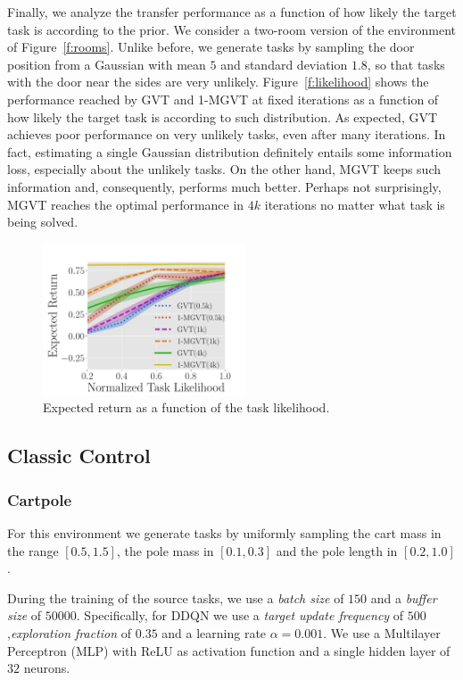 \documentclass{article}
\begin{document}
Finally, we analyze the transfer performance as a function of how likely the target task is according to the prior. We consider a two-room version of the environment of Figure~\ref{f:rooms}. Unlike before, we generate tasks by sampling the door position from a Gaussian with mean $5$ and standard deviation $1.8$, so that tasks with the door near the sides are very unlikely. Figure~\ref{f:likelihood} shows the performance reached by GVT and 1-MGVT at fixed iterations as a function of how likely the target task is according to such distribution. As expected, GVT achieves poor performance on very unlikely tasks, even after many iterations. In fact, estimating a single Gaussian distribution definitely entails some information loss, especially about the unlikely tasks. On the other hand, MGVT keeps such information and, consequently, performs much better. Perhaps not surprisingly, MGVT reaches the optimal performance in $4k$ iterations no matter what task is being solved.

\begin{figure}[t]
\centering
    \includegraphics[trim=0.0cm 0cm 1.2cm 1.3cm,clip=true,height=4.5cm]{images/likelihood/lrew.pdf}
    \caption{Expected return as a function of the task likelihood.}
  \label{fig:likelihood}
\end{figure}


\subsection{Classic Control}\label{app:c2}

\subsubsection{Cartpole}

For this environment we generate tasks by uniformly sampling the cart mass in the range $\left[0.5,1.5\right]$, the pole mass in $\left[0.1,0.3\right]$ and the pole length in $\left[0.2,1.0\right]$. 

During the training of the source tasks, we use a \textit{batch size} of $150$ and a \textit{buffer size} of $50000$. Specifically, for DDQN we use a \textit{target update frequency} of $500$,\textit{exploration fraction} of $0.35$ and a learning rate $\alpha=0.001$. We use a Multilayer Perceptron (MLP) with ReLU as activation function and a single hidden layer of $32$ neurons.
\end{document}
